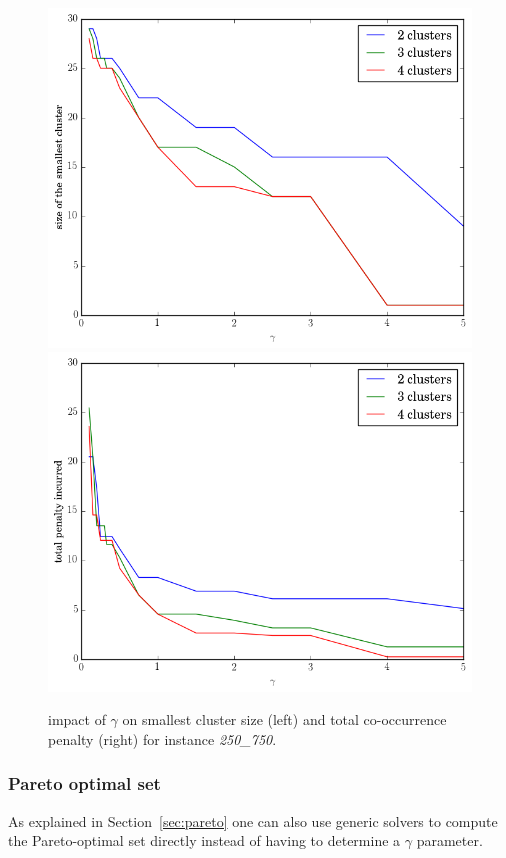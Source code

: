 \documentclass[conference]{IEEEtran}
\begin{document}
\begin{figure}
\centering
\includegraphics[scale=0.25]{images/gamma_smallest_cluster_size}
\includegraphics[scale=0.25]{images/gamma_total_penalty_incurred}
\captionsetup{font=small}
\caption{impact of $\gamma$ on smallest cluster size (left) and total co-occurrence penalty (right) for instance \emph{250\_750}.}
\label{fig:gamma}
\end{figure}

\subsubsection{Pareto optimal set}
As explained in Section~\ref{sec:pareto} one can also use generic solvers to compute the Pareto-optimal set directly instead of having to determine a $\gamma$ parameter.
\end{document}
